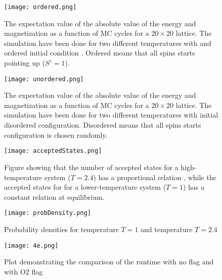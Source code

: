 \documentclass{article}
\begin{document}
\begin{figure}[H]
	\centering
	\texttt{[image: ordered.png]}
	\centering
	\caption{The expectation value of the absolute value of the energy and magnetization as a function of MC cycles for a $20 \times 20$  lattice. The simulation have been done for two different temperatures with and ordered initial condition . Ordered means that all spins starts pointing up ($S^z = 1$). }
	\label{fig: integration limits Gauss-Legendre}
\end{figure}

\begin{figure}[H]
	\centering
	\texttt{[image: unordered.png]}
	\centering
	\caption{The expectation value of the absolute value of the energy and magnetization as a function of MC cycles for a $20 \times 20$ lattice. The simulation have been done for two different temperatures with  initial disordered configuration. Disordered means that all spins starts configuration is chosen randomly. }
	\label{fig: integration limits Gauss-Legendre}
\end{figure}


\begin{figure}[H]
	\centering
	\texttt{[image: acceptedStates.png]}
	\centering
	\caption{Figure showing that the number of accepted states for a high-temperature system ($T=2.4$) has a proportional relation , while the accepted states for for a lower-temperature system ($T=1$) has a constant relation at equilibrium.}
	\label{fig: integration limits Gauss-Legendre}
\end{figure}

\begin{figure}[H]
	\centering
	\texttt{[image: probDensity.png]}
	\centering
	\caption{Probability densities for temperature $T=1$ and temperature $T=2.4$}
	\label{fig: integration limits Gauss-Legendre}
\end{figure}
\begin{figure}[H]
	\centering
	\texttt{[image: 4e.png]}
	\centering
	\caption{ Plot demonstrating the comparison of the runtime with no flag and with O2 flag  }
	\label{fig: integration limits Gauss-Legendre}
\end{figure}
\end{document}
